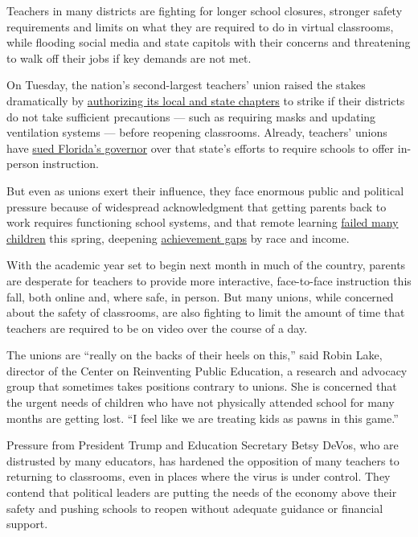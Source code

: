 Teachers in many districts are fighting for longer school closures,
stronger safety requirements and limits on what they are required to do
in virtual classrooms, while flooding social media and state capitols
with their concerns and threatening to walk off their jobs if key
demands are not met.

On Tuesday, the nation's second-largest teachers' union raised the
stakes dramatically by
\href{https://www.nytimes3xbfgragh.onion/2020/07/28/world/coronavirus-covid-19.html\#link-541bdc40}{authorizing
its local and state chapters} to strike if their districts do not take
sufficient precautions --- such as requiring masks and updating
ventilation systems --- before reopening classrooms. Already, teachers'
unions have
\href{https://www.nytimes3xbfgragh.onion/2020/07/20/world/coronavirus-cases.html\#link-2e69dc1c}{sued
Florida's governor} over that state's efforts to require schools to
offer in-person instruction.

But even as unions exert their influence, they face enormous public and
political pressure because of widespread acknowledgment that getting
parents back to work requires functioning school systems, and that
remote learning
\href{https://www.nytimes3xbfgragh.onion/2020/06/05/us/coronavirus-education-lost-learning.html}{failed
many children} this spring, deepening
\href{https://www.nytimes3xbfgragh.onion/2020/06/05/us/coronavirus-education-lost-learning.html}{achievement
gaps} by race and income.

With the academic year set to begin next month in much of the country,
parents are desperate for teachers to provide more interactive,
face-to-face instruction this fall, both online and, where safe, in
person. But many unions, while concerned about the safety of classrooms,
are also fighting to limit the amount of time that teachers are required
to be on video over the course of a day.

The unions are ``really on the backs of their heels on this,'' said
Robin Lake, director of the Center on Reinventing Public Education, a
research and advocacy group that sometimes takes positions contrary to
unions. She is concerned that the urgent needs of children who have not
physically attended school for many months are getting lost. ``I feel
like we are treating kids as pawns in this game.''

Pressure from President Trump and Education Secretary Betsy DeVos, who
are distrusted by many educators, has hardened the opposition of many
teachers to returning to classrooms, even in places where the virus is
under control. They contend that political leaders are putting the needs
of the economy above their safety and pushing schools to reopen without
adequate guidance or financial support.

